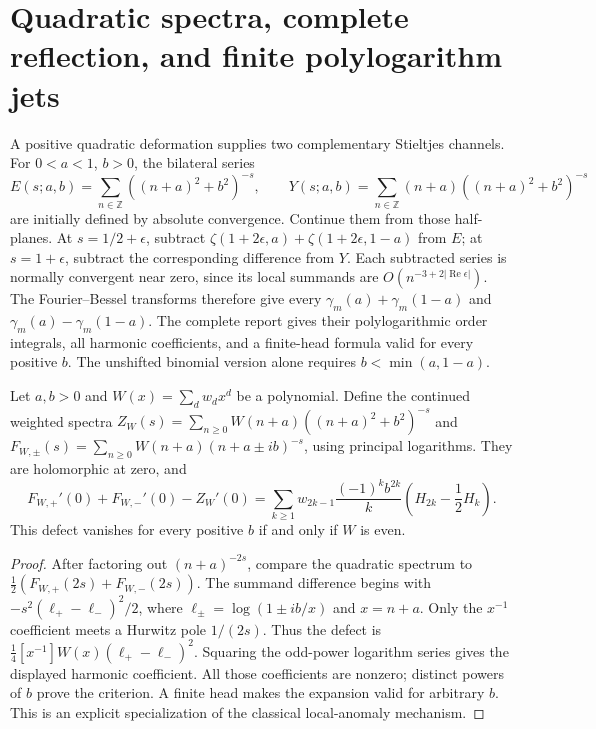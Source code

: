 \section{Quadratic spectra, complete reflection, and finite polylogarithm jets}
\label{qspec:frag:section}

A positive quadratic deformation supplies two complementary Stieltjes
channels. For $0<a<1$, $b>0$, the bilateral series
\[
 E(s;a,b)=\sum_{n\in\mathbb Z}((n+a)^2+b^2)^{-s},\qquad
 Y(s;a,b)=\sum_{n\in\mathbb Z}(n+a)((n+a)^2+b^2)^{-s}
\]
are initially defined by absolute convergence. Continue them from those
half-planes. At $s=1/2+\epsilon$, subtract
$\zeta(1+2\epsilon,a)+\zeta(1+2\epsilon,1-a)$ from $E$; at
$s=1+\epsilon$, subtract the corresponding difference from $Y$.
Each subtracted series is normally convergent near zero, since its local
summands are $O(n^{-3+2|\operatorname{Re}\epsilon|})$.
The Fourier--Bessel transforms therefore give every
$\gamma_m(a)+\gamma_m(1-a)$ and $\gamma_m(a)-\gamma_m(1-a)$.
The complete report \cite{qspec:report} gives their polylogarithmic order
integrals, all harmonic coefficients, and a finite-head formula valid for
every positive $b$. The unshifted binomial version alone requires
$b<\min(a,1-a)$.

\begin{theorem}
\label{qspec:frag:parity}
Let $a,b>0$ and $W(x)=\sum_d w_dx^d$ be a polynomial. Define the
continued weighted spectra $Z_W(s)=\sum_{n\ge0}W(n+a)((n+a)^2+b^2)^{-s}$
and $F_{W,\pm}(s)=\sum_{n\ge0}W(n+a)(n+a\pm ib)^{-s}$, using principal
logarithms. They are holomorphic at zero, and
\[
 F_{W,+}'(0)+F_{W,-}'(0)-Z_W'(0)
 =\sum_{k\ge1}w_{2k-1}\frac{(-1)^kb^{2k}}k
 \left(H_{2k}-\frac12H_k\right).
\]
This defect vanishes for every positive $b$ if and only if $W$ is even.
\end{theorem}
\begin{proof}
After factoring out $(n+a)^{-2s}$, compare the quadratic spectrum to
$\tfrac12(F_{W,+}(2s)+F_{W,-}(2s))$. The summand difference begins with
$-s^2(\ell_+-\ell_-)^2/2$, where
$\ell_\pm=\log(1\pm ib/x)$ and $x=n+a$. Only the $x^{-1}$ coefficient
meets a Hurwitz pole $1/(2s)$. Thus the defect is
$\tfrac14[x^{-1}]W(x)(\ell_+-\ell_-)^2$. Squaring the odd-power
logarithm series gives the displayed harmonic coefficient. All those
coefficients are nonzero; distinct powers of $b$ prove the criterion.
A finite head makes the expansion valid for arbitrary $b$. This is an
explicit specialization of the classical local-anomaly mechanism.
\end{proof}

